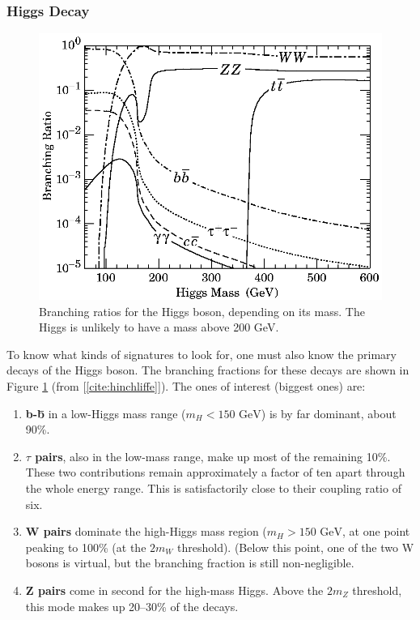\documentclass[12pt]{article}
\begin{document}
\subsubsection{Higgs Decay}

\begin{figure}
  \begin{center}
    \includegraphics[width=0.8\linewidth]{higgs_branching_ratios.eps}
  \end{center}

  \caption{Branching ratios for the Higgs boson, depending on its
  mass. The Higgs is unlikely to have a mass above 200 GeV.}

  \label{fig:branching_ratios}
\end{figure}

To know what kinds of signatures to look for, one must also know the
primary decays of the Higgs boson. The branching fractions for these
decays are shown in Figure \ref{fig:branching_ratios} (from
[\ref{cite:hinchliffe}]). The ones of interest (biggest ones) are:
\begin{enumerate}

  \item {\bf b-\={b}} in a low-Higgs mass range ($m_H < \mbox{150
  GeV}$) is by far dominant, about 90\%.

  \item {\bf $\tau$ pairs}, also in the low-mass range, make up most
  of the remaining 10\%. These two contributions remain approximately
  a factor of ten apart through the whole energy range. This is
  satisfactorily close to their coupling ratio of six.

  \item {\bf W pairs} dominate the high-Higgs mass region ($m_H >
  \mbox{150 GeV}$, at one point peaking to 100\% (at the $2m_W$
  threshold). (Below this point, one of the two W bosons is virtual,
  but the branching fraction is still non-negligible.

  \item {\bf Z pairs} come in second for the high-mass Higgs. Above
  the $2m_Z$ threshold, this mode makes up 20--30\% of the decays.

\end{enumerate}
\end{document}

